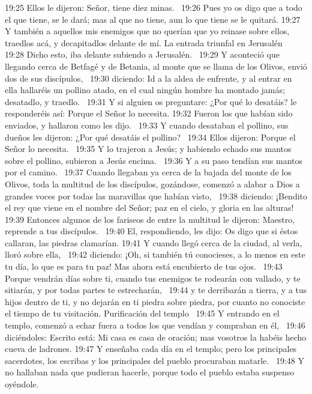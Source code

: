 19:25 Ellos le dijeron: Señor, tiene diez minas.  
19:26 Pues yo os digo que a todo el que tiene, se le dará; mas al que no tiene, aun lo que tiene se le quitará. 
19:27 Y también a aquellos mis enemigos que no querían que yo reinase sobre ellos, traedlos acá, y decapitadlos delante de mí. 
La entrada triunfal en Jerusalén  
19:28 Dicho esto, iba delante subiendo a Jerusalén.  
19:29 Y aconteció que llegando cerca de Betfagé y de Betania, al monte que se llama de los Olivos, envió dos de sus discípulos,  
19:30 diciendo: Id a la aldea de enfrente, y al entrar en ella hallaréis un pollino atado, en el cual ningún hombre ha montado jamás; desatadlo, y traedlo.  
19:31 Y si alguien os preguntare: ¿Por qué lo desatáis? le responderéis así: Porque el Señor lo necesita. 
19:32 Fueron los que habían sido enviados, y hallaron como les dijo.  
19:33 Y cuando desataban el pollino, sus dueños les dijeron: ¿Por qué desatáis el pollino?  
19:34 Ellos dijeron: Porque el Señor lo necesita.  
19:35 Y lo trajeron a Jesús; y habiendo echado sus mantos sobre el pollino, subieron a Jesús encima.  
19:36 Y a su paso tendían sus mantos por el camino.  
19:37 Cuando llegaban ya cerca de la bajada del monte de los Olivos, toda la multitud de los discípulos, gozándose, comenzó a alabar a Dios a grandes voces por todas las maravillas que habían visto,  
19:38 diciendo: ¡Bendito el rey que viene en el nombre del Señor; paz en el cielo, y gloria en las alturas!  
19:39 Entonces algunos de los fariseos de entre la multitud le dijeron: Maestro, reprende a tus discípulos.  
19:40 El, respondiendo, les dijo: Os digo que si éstos callaran, las piedras clamarían. 
19:41 Y cuando llegó cerca de la ciudad, al verla, lloró sobre ella,  
19:42 diciendo: ¡Oh, si también tú conocieses, a lo menos en este tu día, lo que es para tu paz! Mas ahora está encubierto de tus ojos.  
19:43 Porque vendrán días sobre ti, cuando tus enemigos te rodearán con vallado, y te sitiarán, y por todas partes te estrecharán,  
19:44 y te derribarán a tierra, y a tus hijos dentro de ti, y no dejarán en ti piedra sobre piedra, por cuanto no conociste el tiempo de tu visitación. 
Purificación del templo  
19:45 Y entrando en el templo, comenzó a echar fuera a todos los que vendían y compraban en él,  
19:46 diciéndoles: Escrito está: Mi casa es casa de oración; mas vosotros la habéis hecho cueva de ladrones. 
19:47 Y enseñaba cada día en el templo; pero los principales sacerdotes, los escribas y los principales del pueblo procuraban matarle.  
19:48 Y no hallaban nada que pudieran hacerle, porque todo el pueblo estaba suspenso oyéndole.  
